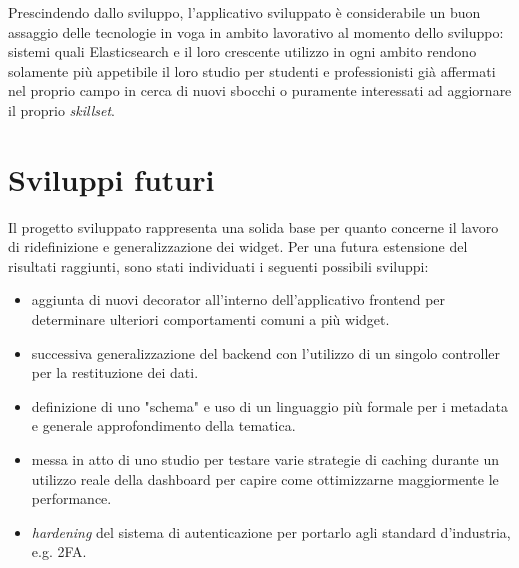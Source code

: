 Prescindendo dallo sviluppo, l'applicativo sviluppato è considerabile un buon assaggio delle tecnologie in voga in ambito lavorativo al momento dello sviluppo: sistemi quali Elasticsearch e il loro crescente utilizzo in ogni ambito rendono solamente più appetibile il loro studio per studenti e professionisti già affermati nel proprio campo  in cerca di nuovi sbocchi o puramente interessati ad aggiornare il proprio \textit{skillset}.

\chapter{Sviluppi futuri}
Il progetto sviluppato rappresenta una solida base per quanto concerne il lavoro di ridefinizione e generalizzazione dei widget. Per una futura estensione del risultati raggiunti, sono stati individuati i seguenti possibili sviluppi:
\begin{itemize}
    \item aggiunta di nuovi decorator all'interno dell'applicativo frontend per determinare ulteriori comportamenti comuni a più widget.
    \item successiva generalizzazione del backend con l'utilizzo di un singolo controller per la restituzione dei dati.
    \item definizione di uno "schema" e uso di un linguaggio più formale per i metadata e generale approfondimento della tematica.
    \item messa in atto di uno studio per testare varie strategie di caching durante un utilizzo reale della dashboard per capire come ottimizzarne maggiormente le performance.
    \item \textit{hardening} del sistema di autenticazione per portarlo agli standard d'industria, e.g. 2FA.
\end{itemize}